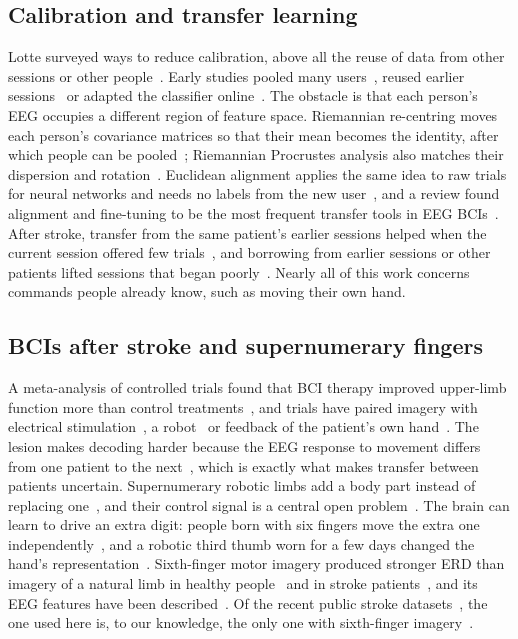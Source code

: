 \subsection{Calibration and transfer learning}
Lotte surveyed ways to reduce calibration, above all the reuse of data from other sessions or
other people~\cite{lotte2015}. Early studies pooled many users~\cite{fazli2009}, reused earlier
sessions~\cite{krauledat2008} or adapted the classifier online~\cite{shenoy2006}. The obstacle is
that each person's EEG occupies a different region of feature space. Riemannian re-centring
moves each person's covariance matrices so that their mean becomes the identity, after which
people can be pooled~\cite{zanini2018}; Riemannian Procrustes analysis also matches their
dispersion and rotation~\cite{rodrigues2019}. Euclidean alignment applies the same idea to raw
trials for neural networks and needs no labels from the new user~\cite{he2020}, and a review
found alignment and fine-tuning to be the most frequent transfer tools in EEG
BCIs~\cite{wu2022review}. After stroke, transfer from the same patient's earlier sessions helped when the current session
offered few trials~\cite{giles2022}, and borrowing from earlier sessions or other patients lifted
sessions that began poorly~\cite{cao2021}. Nearly all of this work concerns commands people already know,
such as moving their own hand.

\subsection{BCIs after stroke and supernumerary fingers}
A meta-analysis of controlled trials found that BCI therapy improved upper-limb function more
than control treatments~\cite{cervera2018}, and trials have paired imagery with electrical
stimulation~\cite{biasiucci2018}, a robot~\cite{ang2015rct} or feedback of the patient's own
hand~\cite{pichiorri2015}. The lesion makes decoding harder because the EEG response to movement
differs from one patient to the next~\cite{park2016}, which is exactly what makes transfer
between patients uncertain. Supernumerary robotic limbs add a body part instead of replacing
one~\cite{prattichizzo2021,tong2021}, and their control signal is a central open
problem~\cite{eden2022}. The brain can learn to drive an extra digit: people born with six
fingers move the extra one independently~\cite{mehring2019}, and a robotic third thumb worn for
a few days changed the hand's representation~\cite{kieliba2021}. Sixth-finger motor imagery
produced stronger ERD than imagery of a natural limb in healthy people~\cite{wang2024jbhi} and
in stroke patients~\cite{wang2024tnsre}, and its EEG features have been
described~\cite{liu2022jne}. Of the recent public stroke
datasets~\cite{liu2024acute,lu2026chronic,liu2025lowerlimb}, the one used here is, to our
knowledge, the only one with sixth-finger imagery~\cite{wang2026dataset}.

